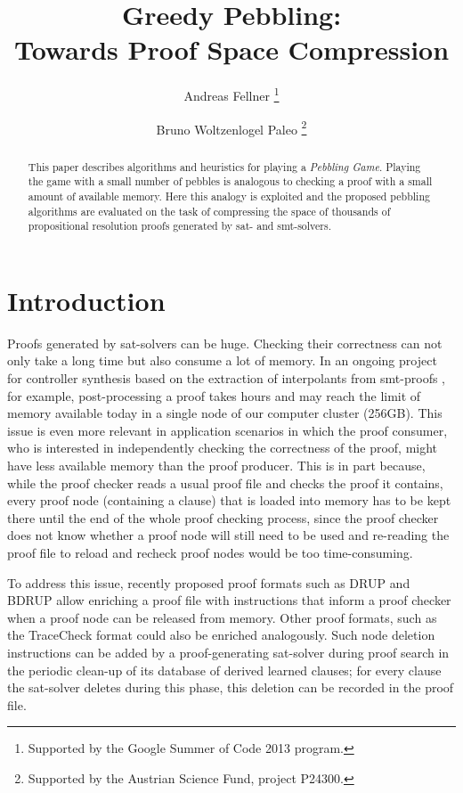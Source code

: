 \documentclass{llncs}
\title{Greedy Pebbling: \\ 
Towards Proof Space Compression}
\author{
  Andreas Fellner 
  \thanks{Supported by the Google Summer of Code 2013 program.}
  \and 
  Bruno Woltzenlogel Paleo 
  \thanks{Supported by the Austrian Science Fund, project P24300.}
}
\institute{
  \email{fellner.a@gmail.com} \ \ \ \email{bruno@logic.at} \\
  Theory and Logic Group \\
  Institute for Computer Languages \\
  Vienna University of Technology
}
\begin{document}
\maketitle

\begin{abstract}
This paper describes algorithms and heuristics for playing a \emph{Pebbling Game}. Playing the game with a small number of pebbles is analogous to checking a proof with a small amount of available memory. Here this analogy is exploited and the proposed pebbling algorithms are evaluated on the task of compressing the space of thousands of propositional resolution proofs generated by sat- and smt-solvers.
\end{abstract}

\setcounter{footnote}{0}


\section{Introduction}

Proofs generated by sat-solvers can be huge. 
Checking their correctness can not only take a long time but also consume a lot of memory. 
In an ongoing project for controller synthesis based on the extraction of interpolants from smt-proofs \cite{Hofferek}, 
for example, post-processing a proof takes hours and may reach the limit of memory available today in a single node of our computer cluster (256GB). This issue is even more relevant in application scenarios in which the proof consumer, who is interested in independently checking the correctness of the proof, might have less available memory than the proof producer.
This is in part because, while the proof checker reads a usual proof file and checks the proof it contains, 
every proof node (containing a clause) that is loaded into memory has to be kept there until the end of the whole proof checking process, 
since the proof checker does not know whether a proof node will still need to be used and re-reading the proof file to reload and recheck proof nodes would be too time-consuming. 

To address this issue, recently proposed proof formats such as DRUP \cite{drup} and BDRUP \cite{bdrup} allow enriching a proof file with instructions that inform a proof checker when a proof node can be released from memory. Other proof formats, such as the TraceCheck format \cite{tracecheck} could also be enriched analogously. Such node deletion instructions can be added by a proof-generating sat-solver during proof search in the periodic clean-up of its database of derived learned clauses; for every clause the sat-solver deletes during this phase, this deletion can be recorded in the proof file. 
\end{document}
